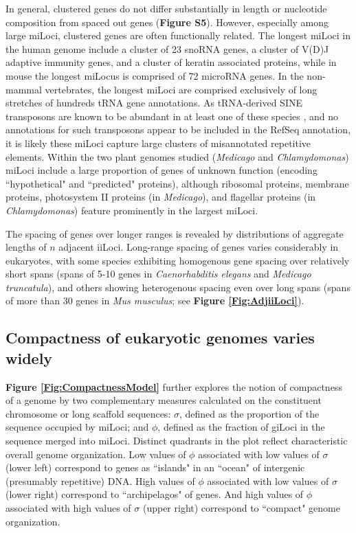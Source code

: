 In general, clustered genes do not differ substantially in length or nucleotide composition from spaced out genes (\textbf{Figure S5}).
However, especially among large miLoci, clustered genes are often functionally related.
The longest miLoci in the human genome include a cluster of 23 snoRNA genes, a cluster of V(D)J adaptive immunity genes, and a cluster of keratin associated proteins, while in mouse the longest miLocus is comprised of 72 microRNA genes.
In the non-mammal vertebrates, the longest miLoci are comprised exclusively of long stretches of hundreds tRNA gene annotations.
As tRNA-derived SINE transposons are known to be abundant in at least one of these species \cite{DrerGenome}, and no annotations for such transposons appear to be included in the RefSeq annotation, it is likely these miLoci capture large clusters of misannotated repetitive elements.
Within the two plant genomes studied (\textit{Medicago} and \textit{Chlamydomonas}) miLoci include a large proportion of genes of unknown function (encoding ``hypothetical" and ``predicted" proteins), although ribosomal proteins, membrane proteins, photosystem II proteins (in \textit{Medicago}), and flagellar proteins (in \textit{Chlamydomonas}) feature prominently in the largest miLoci.

The spacing of genes over longer ranges is revealed by distributions of aggregate lengths of $n$ adjacent iiLoci.
Long-range spacing of genes varies considerably in eukaryotes, with some species exhibiting homogenous gene spacing over relatively short spans (spans of 5-10 genes in \textit{Caenorhabditis elegans} and \textit{Medicago truncatula}), and others showing heterogenous spacing even over long spans (spans of more than 30 genes in \textit{Mus musculus}; see \textbf{Figure \ref{Fig:AdjiiLoci}}).

\subsection{Compactness of eukaryotic genomes varies widely}

\textbf{Figure \ref{Fig:CompactnessModel}} further explores the notion of compactness of a genome by two complementary measures calculated on the constituent chromosome or long scaffold sequences:
$\sigma$, defined as the proportion of the sequence occupied by miLoci;
and $\phi$, defined as the fraction of giLoci in the sequence merged into miLoci.
Distinct quadrants in the plot reflect characteristic overall genome organization.
Low values of $\phi$ associated with low values of $\sigma$ (lower left) correspond to genes as ``islands" in an ``ocean" of intergenic (presumably repetitive) DNA.
High values of $\phi$ associated with low values of $\sigma$ (lower right) correspond to ``archipelagos" of genes.
And high values of $\phi$ associated with high values of $\sigma$ (upper right) correspond to ``compact" genome organization.

